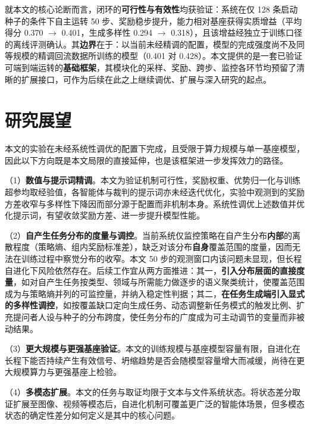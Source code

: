 就本文的核心论断而言，闭环的\textbf{可行性与有效性}均获验证：系统在仅 128 条启动种子的条件下自主运转 50 步、奖励稳步提升，能力相对基座获得实质增益（平均得分 0.370 $\to$ 0.401，生成多样性 0.294 $\to$ 0.318），且该增益经独立于训练口径的离线评测确认。其\textbf{边界}在于：以当前未经精调的配置，模型的完成强度尚不及同等规模的精调回流数据所训练的模型（0.401 对 0.428）。本文提供的是一套已验证可端到端运转的\textbf{基础框架}，其模块化的采样、奖励、跨步、监控各环节均预留了清晰的扩展接口，可作为后续在此之上继续调优、扩展与深入研究的起点。

\section{研究展望}

本文的实验在未经系统性调优的配置下完成，且受限于算力规模与单一基座模型，因此以下方向既是本文局限的直接延伸，也是该框架进一步发挥效力的路径。

（1）\textbf{数值与提示词精调}。本文为验证机制可行性，奖励权重、优势归一化与训练超参均取经验值，各智能体与裁判的提示词亦未经迭代优化，实验中观测到的奖励方差收窄与多样性下降因而部分源于配置而非机制本身。系统性调优上述数值并优化提示词，有望收敛奖励方差、进一步提升模型性能。

（2）\textbf{自产生任务分布的度量与调控}。当前系统仅监控策略在自产生分布\textbf{内部}的离散程度（策略熵、组内奖励标准差），缺乏对该分布\textbf{自身}覆盖范围的度量，因而无法在训练过程中察觉分布的收窄。本文 50 步的观测窗口内该问题未显现，但长程自进化下风险依然存在。后续工作宜从两方面推进：其一，\textbf{引入分布层面的直接度量}，如对自产生任务按类型、领域与所需能力做逐步的语义聚类统计，使覆盖范围成为与策略熵并列的可监控量，并纳入稳定性判据；其二，\textbf{在任务生成端引入显式的多样性调控}，如按覆盖缺口定向生成任务、动态调整新任务模式的触发比例、扩充提问者人设与种子的分布跨度，使任务分布的广度成为可主动调节的变量而非被动结果。

（3）\textbf{更大规模与更强基座验证}。本文的训练规模与基座模型容量有限，自进化在长程下能否持续产生有效信号、坍缩趋势是否会随模型容量增大而减缓，尚待在更大规模算力与更强基座上检验。

（4）\textbf{多模态扩展}。本文的任务与取证均限于文本与文件系统状态。将状态差分取证扩展至图像、视频等模态后，自进化机制可覆盖更广泛的智能体场景，但多模态状态的确定性差分如何定义是其中的核心问题。
